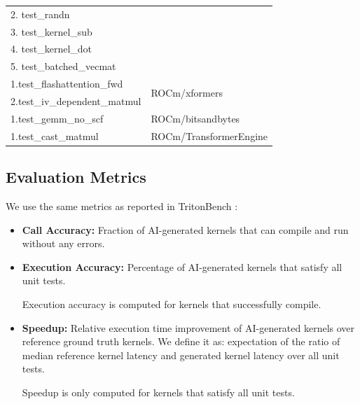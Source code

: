 \begin{table}
\begin{tabular}{ll}
    2. test\_randn    & \\
    3. test\_kernel\_sub &\\
    4. test\_kernel\_dot &\\
    5. test\_batched\_vecmat &\\
    \bottomrule
    1.test\_flashattention\_fwd & \multirow{2}{*}{ROCm/xformers}\\
    2.test\_iv\_dependent\_matmul &\\
    \midrule
    1.test\_gemm\_no\_scf & ROCm/bitsandbytes \\
    \midrule
    1.test\_cast\_matmul &ROCm/TransformerEngine \\
    \bottomrule
  \end{tabular}
  \label{tab:table}
\end{table}

\subsection{Evaluation Metrics}
We use the same metrics as reported in TritonBench \cite{li2025tritonbenchbenchmarkinglargelanguage}: 

\begin{itemize}
    \item \textbf{Call Accuracy:} Fraction of AI-generated kernels that can compile and run without any errors. 
    \item \textbf{Execution Accuracy:} Percentage of AI-generated kernels that satisfy all unit tests.

    Execution accuracy is computed for kernels that successfully compile.
    
    \item \textbf{Speedup:} Relative execution time improvement of AI-generated kernels over reference ground truth kernels. We define it as: expectation of the ratio of median reference kernel latency and generated kernel latency over all unit tests.

    Speedup is only computed for kernels that satisfy all unit tests.

\end{itemize}
